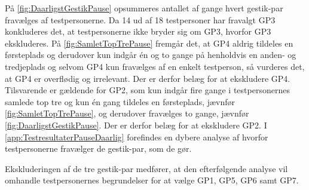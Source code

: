 På \autoref{fig:DaarligstGestikPause} opsummeres antallet af gange hvert gestik-par fravælges af testpersonerne. Da 14 ud af 18 testpersoner har fravalgt GP3 konkluderes det, at testpersonerne ikke bryder sig om GP3, hvorfor GP3 ekskluderes. På \autoref{fig:SamletTopTrePause} fremgår det, at GP4 aldrig tildeles en førsteplads og derudover kun indgår én og to gange på henholdvis en anden- og tredjeplads og selvom GP4 kun fravælges af en enkelt testperson, så vurderes det, at GP4 er overflødig og irrelevant. Der er derfor belæg for at ekskludere GP4. Tilsvarende er gældende for GP2, som kun indgår fire gange i testpersonernes samlede top tre og kun én gang tildeles en førsteplads, jævnfør \autoref{fig:SamletTopTrePause}, og derudover fravælges to gange, jævnfør \autoref{fig:DaarligstGestikPause}. Der er derfor belæg for at ekskludere GP2. I \autoref{app:TestresultaterPauseDaarlig} forefindes en dybere analyse af hvorfor testpersonerne fravælger de gestik-par, som de gør.

Ekskluderingen af de tre gestik-par medfører, at den efterfølgende analyse vil omhandle testpersonernes begrundelser for at vælge GP1, GP5, GP6 samt GP7.
%
